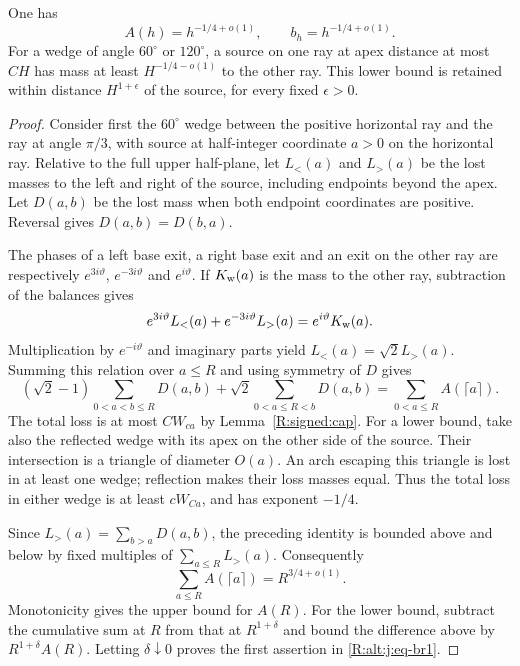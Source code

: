 \begin{lemma}\label{R:signed:strip-mass}
One has
\begin{equation}\label{R:alt:j:eq-br1}
 A(h)=h^{-1/4+o(1)},\qquad b_h=h^{-1/4+o(1)}.
\end{equation}
For a wedge of angle $60^\circ$ or $120^\circ$, a source on one ray at
apex distance at most $CH$ has mass at least $H^{-1/4-o(1)}$ to the other
ray. This lower bound is retained within distance $H^{1+\epsilon}$ of
the source, for every fixed $\epsilon>0$.
\end{lemma}
\begin{proof}
Consider first the $60^\circ$ wedge between the positive horizontal ray
and the ray at angle $\pi/3$, with source at half-integer coordinate
$a>0$ on the horizontal ray. Relative to the full upper half-plane,
let $L_<(a)$ and $L_>(a)$ be the lost masses to the left and right of the
source, including endpoints beyond the apex. Let $D(a,b)$ be the lost
mass when both endpoint coordinates are positive. Reversal gives
$D(a,b)=D(b,a)$.

The phases of a left base exit, a right base exit and an exit on the
other ray are respectively $e^{3i\vartheta}$, $e^{-3i\vartheta}$ and
$e^{i\vartheta}$. If $K_{\rm w}(a)$ is the mass to the other ray,
subtraction of the balances gives
\[
 e^{3i\vartheta}L_<(a)+e^{-3i\vartheta}L_>(a)
       =e^{i\vartheta}K_{\rm w}(a).
\]
Multiplication by $e^{-i\vartheta}$ and imaginary parts yield
$L_<(a)=\sqrt2 L_>(a)$. Summing this relation over $a\le R$ and using
symmetry of $D$ gives
\[
 (\sqrt2-1)\sum_{0<a<b\le R}D(a,b)
 +\sqrt2\sum_{0<a\le R<b}D(a,b)
   =\sum_{0<a\le R}A(\lceil a\rceil).
\]
The total loss is at most $CW_{ca}$ by Lemma~\ref{R:signed:cap}. For a
lower bound, take also the reflected wedge with its apex on the other
side of the source. Their intersection is a triangle of diameter $O(a)$.
An arch escaping this triangle is lost in at least one wedge; reflection
makes their loss masses equal. Thus the total loss in either wedge is
at least $cW_{Ca}$, and has exponent $-1/4$.

Since $L_>(a)=\sum_{b>a}D(a,b)$, the preceding identity is bounded above
and below by fixed multiples of $\sum_{a\le R}L_>(a)$. Consequently
\[
 \sum_{a\le R} A(\lceil a\rceil)=R^{3/4+o(1)}.
\]
Monotonicity gives the upper bound for $A(R)$. For the lower bound,
subtract the cumulative sum at $R$ from that at $R^{1+\delta}$ and bound
the difference above by $R^{1+\delta}A(R)$. Letting $\delta\downarrow0$
proves the first assertion in \eqref{R:alt:j:eq-br1}.


\end{proof}
